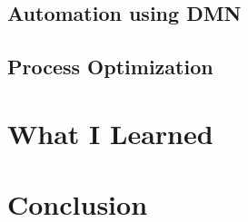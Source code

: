 \documentclass[12pt]{article}
\begin{document}
{  \subsection{Automation using DMN}
  \subsection{Process Optimization}

\pagebreak

\section{What I Learned}

\pagebreak

\section{Conclusion}

}

\printbibliography
\end{document}
